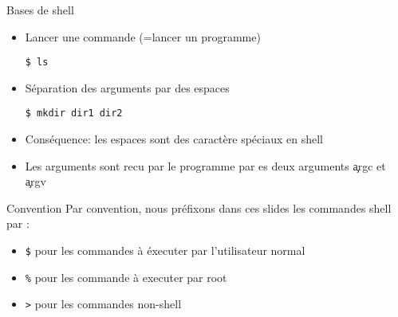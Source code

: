 \begin{frame}[fragile=singleslide]{Bases de shell}
  \begin{itemize}
  \item Lancer une commande (=lancer un programme)
    \begin{lstlisting}
$ ls
    \end{lstlisting} %
  \item Séparation des arguments par des espaces
    \begin{lstlisting}
$ mkdir dir1 dir2
    \end{lstlisting} %
  \item Conséquence: les espaces sont des caractère spéciaux en shell
  \item Les arguments sont recu par le programme par es deux arguments
    \c{argc} et \c{argv}
  \end{itemize}
\end{frame}

\begin{frame}[fragile=singleslide]{Convention}
  Par convention,  nous préfixons dans ces slides  les commandes shell
  par :
  \begin{itemize}
  \item  \verb+$+  pour les  commandes  à  éxecuter par  l'utilisateur
    normal
  \item \verb+%+ pour les commande à executer par root
  \item \verb+>+ pour les commandes non-shell
  \end{itemize}
\end{frame}

